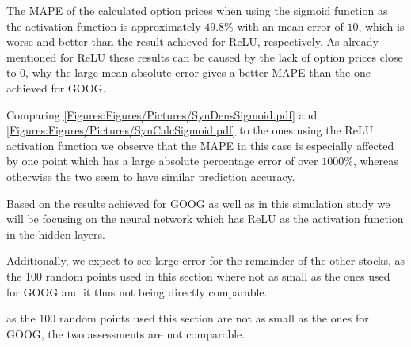 
The MAPE of the calculated option prices when using the sigmoid function as the activation function is approximately $49.8\%$ with an mean error of $10$, which is worse and better than the result achieved for ReLU, respectively. As already mentioned for ReLU these results can be caused by the lack of option prices close to $0$, why the large mean absolute error gives a better MAPE than the one achieved for GOOG.

Comparing \autoref{Figures:Figures/Pictures/SynDensSigmoid.pdf} and \autoref{Figures:Figures/Pictures/SynCalcSigmoid.pdf} to the ones using the ReLU activation function we observe that the MAPE in this case is especially affected by one point which has a large absolute percentage error of over $1000\%$, whereas otherwise the two seem to have similar prediction accuracy. 

Based on the results achieved for GOOG as well as in this simulation study we will be focusing on the neural network which has ReLU as the activation function in the hidden layers.

Additionally, we expect to see large error for the remainder of the other stocks, as the 100 random points used in this section where not as small as the ones used for GOOG and it thus not being directly comparable. 

as the 100 random points used this section are not as small as the ones for GOOG, the two assessments are not comparable. 